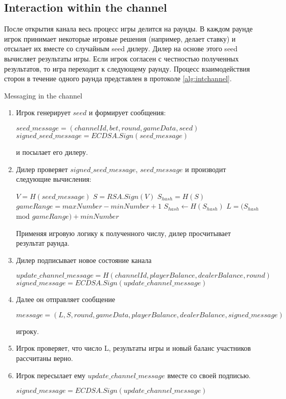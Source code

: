 		\subsection {Interaction within the channel}
После открытия канала весь процесс игры делится на раунды. В каждом раунде игрок принимает некоторые игровые решения (например, делает ставку) и отсылает их вместе со случайным seed дилеру. Дилер на основе этого seed вычисляет результаты игры. Если игрок согласен с честностью полученных результатов, то игра переходит к следующему раунду. Процесс взаимодействия сторон в течение одного раунда представлен в протоколе \autoref{alg:intchannel}. \\
\begin{algorithm}
\caption{Messaging in the channel} \label{alg:intchannel}
\begin{enumerate}
	\item Игрок генерирует $seed$  и  формирует сообщения:
\begin{center}
$ seed\_message = (channelId, bet, round, gameData, seed)$
$signed\_seed\_message = ECDSA.Sign(seed\_message)$ 
\end{center}
 и посылает его дилеру. 
	\item Дилер проверяет $signed\_seed\_message$, $seed\_message$ и производит следующие вычисления:
 \begin{algorithmic}
\State $V = H(seed\_message)$
\State $S = RSA.Sign(V)$
\State $S_{hash} = H(S)$
\State $gameRange = maxNumber -  minNumber + 1$
\State$ S_{hash}\gets H(S_{hash})$
\EndWhile
\State $L = (S_{hash}$ mod $gameRange) + minNumber$
 \end{algorithmic}
 Применяя игровую логику к полученного числу, дилер просчитывает результат раунда.
\item Дилер подписывает новое состояние канала
\begin{center}

$update\_channel\_message = H(channelId, playerBalance, dealerBalance, round)$
$signed\_message = ECDSA.Sign(update\_channel\_message)$

\end{center}
\item Далее он отправляет сообщение
\begin{center}

$message = (L,S, round, gameData, playerBalance, dealerBalance, signed\_message)$

\end{center}
 игроку.
	\item Игрок проверяет, что число L, результаты игры и новый баланс участников рассчитаны верно.
	\item Игрок пересылает ему $update\_channel\_message$ вместе со своей подписью. 
\begin{center}
 $signed\_message = ECDSA.Sign(update\_channel\_message)$
\end{center}
\end{enumerate}
\end{algorithm}


